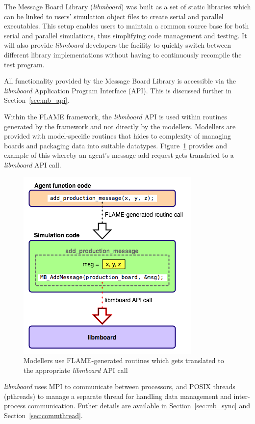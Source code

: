 The Message Board Library (\textit{libmboard}) was built as a set of static libraries which can be linked to users' simulation object files to create serial and parallel executables. This setup enables users to maintain a common source base for both serial and parallel simulations, thus simplifying code management and testing. It will also provide \textit{libmboard} developers the facility to quickly switch between different library implementations without having to continuously recompile the test program.

All functionality provided by the Message Board Library is accessible via the \textit{libmboard} Application Program Interface (API). This is discussed further in Section~\ref{sec:mb_api}.

Within the FLAME framework, the \textit{libmboard} API is used within routines generated by the framework and not directly by the modellers. Modellers are provided with model-specific routines that hides to complexity of managing boards and packaging data into suitable datatypes. Figure~\ref{fig:mb_api_flame} provides and example of this whereby an agent's message add request gets translated to a \textit{libmboard} API call.
\begin{figure}[h]
 \centering
  \includegraphics[scale=0.50]{mboard_codetranslate.png}
 \caption{Modellers use FLAME-generated routines which gets translated to the appropriate \textit{libmboard} API call}
 \label{fig:mb_api_flame}
\end{figure}

\textit{libmboard} uses MPI to communicate between processors, and POSIX threads (pthreads) to manage a separate thread for handling data management and inter-process communication. Futher details are available in Section~\ref{sec:mb_sync} and Section~\ref{sec:commthread}.

